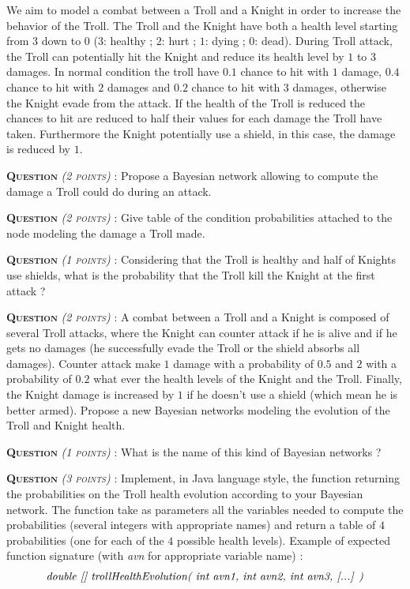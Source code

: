 \documentclass[a4paper, 10pt]{article}
\newcounter{QQ}
\newcommand{\question}[1]{ \medskip \sffamily \textsc{\textbf{\large Question \stepcounter{QQ} \arabic{QQ}} \emph{\small(#1)}} : }
\begin{document}
  We aim to model a combat between a Troll and a Knight in order to increase the behavior of the Troll.
  The Troll and the Knight have both a health level starting from $3$ down to $0$ ($3$: healthy ; $2$: hurt ; $1$: dying ; $0$: dead).
  During Troll attack, the Troll can potentially hit the Knight and reduce its health level by $1$ to $3$ damages.
  In normal condition the troll have $0.1$ chance to hit with $1$ damage, $0.4$ chance to hit with $2$ damages and $0.2$ chance to hit with $3$ damages, otherwise the Knight evade from the attack.
  If the health of the Troll is reduced the chances to hit are reduced to half their values for each damage the Troll have taken.
  Furthermore the Knight potentially use a shield, in this case, the damage is reduced by $1$.

\question{2 points}
  Propose a Bayesian network allowing to compute the damage a Troll could do during an attack.
  
\question{2 points}
  Give table of the condition probabilities attached to the node modeling the damage a Troll made.

\question{1 points}
  Considering that the Troll is healthy and half of Knights use shields, what is the probability that the Troll kill the Knight at the first attack ?

\question{2 points}
  A combat between a Troll and a Knight is composed of several Troll attacks, where the Knight can counter attack if he is alive and if he gets no damages (he successfully evade the Troll or the shield absorbs all damages).
  Counter attack make $1$ damage with a probability of $0.5$ and $2$ with a probability of $0.2$ what ever the health levels of the Knight and the Troll.
  Finally, the Knight damage is increased by $1$ if he doesn't use a shield (which mean he is better armed).
  Propose a new Bayesian networks modeling the evolution of the Troll and Knight health.

\question{1 points} What is the name of this kind of Bayesian networks ?

\question{3 points}
  Implement, in Java language style, the function returning the probabilities on the Troll health evolution according to your Bayesian network.
  The function take as parameters all the variables needed to compute the probabilities (several integers with appropriate names) and return a table of $4$ probabilities (one for each of the $4$ possible health levels).
  Example of expected function signature (with \emph{avn} for appropriate variable name)  : 
  $$ \text{\emph{ double [] trollHealthEvolution( int avn1,  int avn2,  int avn3, [...] ) }} $$
\end{document}

